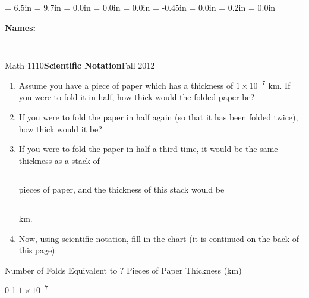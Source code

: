 \documentclass{article}
\begin{document}
\textwidth = 6.5in
\textheight = 9.7in
\oddsidemargin = 0.0in
\evensidemargin = 0.0in
\topmargin = 0.0in
\headheight = -0.45in
\headsep = 0.0in
\parskip = 0.2in
\parindent = 0.0in

\pagestyle{empty}

\textbf{Names:} \rule{6.1in}{0.01in}

\vspace{0.3in}

\noindent\rule{6.7in}{0.01in}

\centerline{Math 1110\hfill{\bf Scientific Notation}\hfill Fall 2012}

\vspace{0.2in}

\begin{enumerate}

\item Assume you have a piece of paper which has a thickness of $1\times 10^{-7}$ km. If you were to fold it in half, how thick would the folded paper be?

\vspace{0.5in}

\item If you were to fold the paper in half again (so that it has been folded twice), how thick would it be?

\vspace{0.5in}

\item If you were to fold the paper in half a third time, it would be the same thickness as a stack of \rule{0.5in}{0.01in} pieces of paper, and the thickness of this stack would be \rule{0.5in}{0.01in} km.

\vspace{0.7in}

\item Now, using scientific notation, fill in the chart (it is continued on the back of this page):

\end{enumerate}

Number of Folds  \hspace{0.3in}  Equivalent to ? Pieces of Paper \hspace{0.3in}  Thickness (km) \newline

\vspace{0.1in}

0 \hspace{1.3in}  1 \hspace{2.2in} $1\times 10^{-7}$
\end{document}
